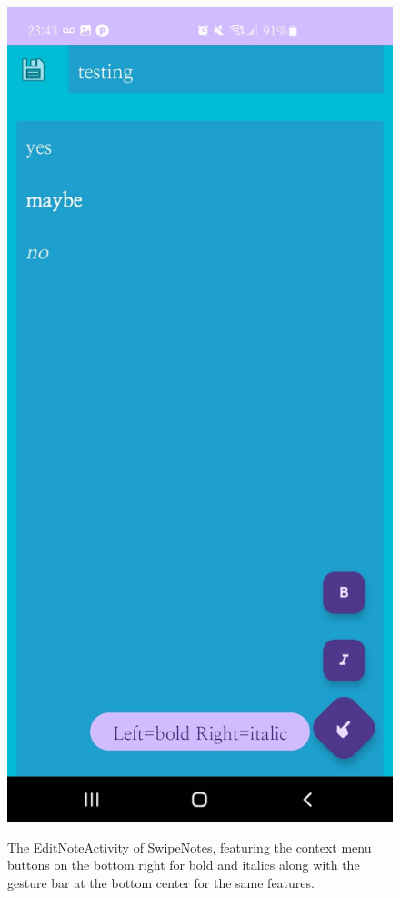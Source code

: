 \documentclass[conference]{IEEEtran}
\begin{document}
\begin{figure}[ht]
    \centering
    \includegraphics[scale=0.15]{images/editnote.jpg}\\
    \caption{The EditNoteActivity of SwipeNotes, featuring the context menu buttons on the bottom right for bold and italics along with the gesture bar at the bottom center for the same features.}
    \label{fig:enter-label}
\end{figure}
\end{document}
